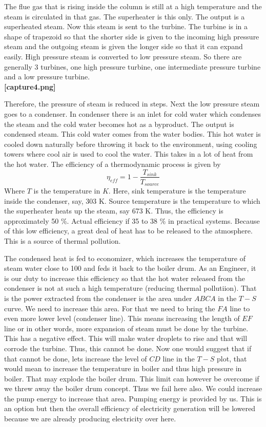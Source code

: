 \documentclass{report}
\begin{document}
\par The flue gas that is rising inside the column is still at a high temperature and the steam is circulated in that gas. The superheater is this only. The output is a superheated steam. Now this steam is sent to the turbine.  The turbine is in a shape of trapezoid so that the shorter side is given to the incoming high pressure steam and the outgoing steam is given the longer side so that it can expand easily. High pressure steam is converted to low pressure steam. So there are generally 3 turbines, one high pressure turbine, one intermediate pressure turbine and a low pressure turbine. 
\\ {\bf [capture4.png]}
\par Therefore, the pressure of steam is reduced in steps. Next the low pressure steam goes to a condenser. In condenser there is an inlet for cold water which condenses the steam and the cold water becomes hot as a byproduct. The output is condensed steam. This cold water comes from the water bodies. This hot water is cooled down naturally before throwing it back to the environment, using cooling towers where cool air is used to cool the water. This takes in a lot of heat from the hot water. 
The efficiency of a thermodynamic process is given by
\begin{equation}
\displaystyle \eta_{eff} = 1 - \frac{T_{sink}}{T_{source}}
\end{equation}
Where $T$ is the temperature in $K$. Here, sink temperature is the temperature inside the condenser, say, 303 K. Source temperature is the temperature to which the superheater heats up the steam, say 673 K. Thus, the efficiency is  approximately 50 \%. Actual efficiency if 35 to 38 \% in practical systems. Because of this low efficiency, a great deal of heat has to be released to the atmosphere. This is a source of thermal pollution. 

\par The condensed heat is fed to economizer, which increases the temperature of steam water close to 100 and feds it back to the boiler drum. As an Engineer, it is our duty to increase this efficiency so that the hot water released from the condenser is not at such a high temperature (reducing thermal pollutiion). That is the power extracted from the condenser is the area under $ABCA$ in the $T-S$ curve. We need to increase this area. For that we need to bring the $FA$ line to even more lower level (condenser line). This means increasing the length of $EF$ line or in other words,  more expansion of steam must be done by the turbine. This has a negative effect. This will make water droplets to rise and that will corrode the turbine. Thus, this cannot be done. Now one would suggest that if that cannot be done, lets increase the level of $CD$ line in the $T-S$ plot, that would mean to increase the temperature in boiler and thus high pressure in boiler. That may explode the boiler drum.  This limit can however be overcome if we threw away the boiler drum concept. Thus we fail here also. We could increase the pump energy to increase that area. Pumping energy is provided by us. This is an option but then the overall efficiency of electricity generation will be lowered because we are already producing electricity over here.
\end{document}
